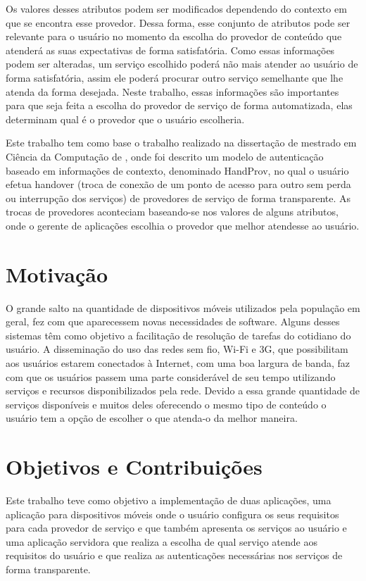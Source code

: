 Os valores desses atributos podem ser modificados dependendo do contexto em que se encontra esse provedor. Dessa forma, esse conjunto de atributos pode ser relevante para o usuário no momento da escolha do provedor de conteúdo que atenderá as suas expectativas de forma satisfatória. Como essas informações podem ser alteradas, um serviço escolhido poderá não mais atender ao usuário de forma satisfatória, assim ele poderá procurar outro serviço semelhante que lhe atenda da forma desejada. Neste trabalho, essas informações são importantes para que seja feita a escolha do provedor de serviço de forma automatizada, elas determinam qual é o provedor que o usuário escolheria.

Este trabalho tem como base o trabalho realizado na dissertação de mestrado em Ciência da Computação de \cite{praca12}, onde foi descrito um modelo de autenticação baseado em informações de contexto, denominado HandProv, no qual o usuário efetua handover (troca de conexão de um ponto de acesso para outro sem perda ou interrupção dos serviços) de provedores de serviço de forma transparente. As trocas de provedores aconteciam baseando-se nos valores de alguns atributos, onde o gerente de aplicações escolhia o provedor que melhor atendesse ao usuário. 

\section{Motivação}
O grande salto na quantidade de dispositivos móveis utilizados pela população em geral, fez com que aparecessem novas necessidades de software. Alguns desses sistemas têm como objetivo a facilitação de resolução de tarefas do cotidiano do usuário.
A disseminação do uso das redes sem fio, Wi-Fi e 3G, que possibilitam aos usuários estarem conectados à Internet, com uma boa largura de banda, faz com que os usuários passem uma parte considerável de seu tempo utilizando serviços e recursos disponibilizados pela rede.
Devido a essa grande quantidade de serviços disponíveis e muitos deles oferecendo o mesmo tipo de conteúdo o usuário tem a opção de escolher o que atenda-o da melhor maneira.

\section{Objetivos e Contribuições}
Este trabalho teve como objetivo a implementação de duas aplicações, uma aplicação para dispositivos móveis onde o usuário configura os seus requisitos para cada provedor de serviço e que também apresenta os serviços ao usuário e uma aplicação servidora que realiza a escolha de qual serviço atende aos requisitos do usuário e que realiza as autenticações necessárias nos serviços de forma transparente.

